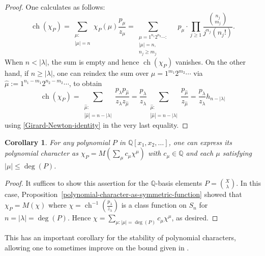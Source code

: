 \documentclass[12pt]{amsart}
\theoremstyle{plain}
\newtheorem{cor}[thm]{Corollary}
\theoremstyle{definition}
\begin{document}
\begin{proof}
One calculates as follows:
$$
{{\operatorname{ch}}} \left( \chi_P \right) 
= \sum_{\substack{\mu: \\ |\mu|=n}} \chi_P(\mu) \frac{p_\mu}{z_\mu} 
= \sum_{\substack{\mu=1^{n_1} 2^{n_2} \cdots: \\ |\mu|=n, \\ n_j \geq m_j}} 
      \quad  p_\mu \cdot \displaystyle \prod_{j \geq 1} 
                             \frac{ \binom{n_j}{m_j}} { j^{n_j} (n_j!) }. 
$$
When $n < |\lambda|$, the sum is empty and
hence ${{\operatorname{ch}}}(\chi_P)$ vanishes.  On the other hand, 
if $n \geq |\lambda|$, one can reindex the sum over $\mu=1^{m_1} 2^{m_2} \cdots$ 
via $\hat{\mu}:=1^{n_1-m_1} 2^{n_2-m_2} \cdots$, to obtain
$$
{{\operatorname{ch}}} \left( \chi_P \right) =
       \sum_{\substack{ \hat{\mu}: \\ |\hat{\mu}|=n-|\lambda|} }  
             \frac{p_\lambda p_{\hat{\mu}} }{z_\lambda z_{\hat{\mu} }} 
 = \frac{p_\lambda}{z_\lambda}        
       \sum_{\substack{ \hat{\mu}: \\ |\hat{\mu}|=n-|\lambda|} }  
         \frac{p_{\hat{\mu}} }{z_{\hat{\mu} }}
 = \frac{p_\lambda}{z_\lambda} h_{n-|\lambda|} 
$$
using \eqref{Girard-Newton-identity} in the very last equality.
\end{proof}

\begin{cor}
\label{polynomial-characters-in-M-form}
For any polynomial $P$ in ${{\mathbb Q}}[x_1,x_2,\ldots]$, 
one can express its polynomial character as
$
\chi_P = M\left( \sum_\mu c_\mu \chi^{\mu} \right)
$
with $c_\mu \in {{\mathbb Q}}$ and each 
$\mu$ satisfying $|\mu| \leq \deg(P)$.
\end{cor}
\begin{proof}
It suffices to show this assertion for the ${{\mathbb Q}}$-basis elements
$P=\binom{X}{\lambda}$.  In this case, 
Proposition~\ref{polynomial-character-as-symmetric-function} showed that 
$\chi_P  = M(\chi)$ where 
$\chi={{\operatorname{ch}}}^{-1}\left( \frac{p_\lambda}{z_\lambda} \right)$ is a 
class function on $S_n$ for $n=|\lambda|=\deg(P)$.
Hence $\chi=\sum_{\mu: |\mu|=\deg(P)} c_\mu \chi^\mu$, as desired.
\end{proof}

This has an important corollary for the stability of polynomial characters,
allowing one to sometimes improve on the 
bound given in \cite[Prop. 3.9]{CEF2}.
\end{document}
